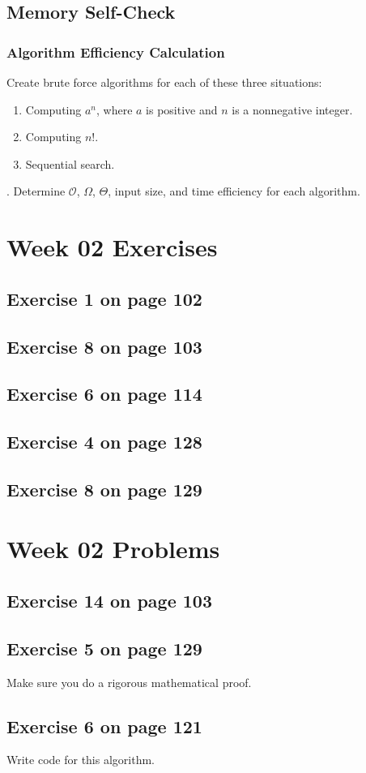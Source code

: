 \documentclass[12pt]{amsart}
\begin{document}
\subsection{Memory Self-Check}

\subsubsection{Algorithm Efficiency Calculation}

Create brute force algorithms for each of these three situations:
\begin{enumerate}
     \item Computing $a^n$, where $a$ is positive and $n$ is a nonnegative integer.
     \item Computing $n!$.
     \item Sequential search.
\end{enumerate}.
Determine $\mathcal{O}$, $\Omega$, $\Theta$, input size, and time efficiency for each algorithm. 



\section{Week 02 Exercises}
\subsection{ Exercise 1 on page 102} 
\subsection{Exercise 8 on page 103} 
\subsection{Exercise 6 on page 114} 
\subsection{Exercise 4 on page 128} 
\subsection{Exercise 8 on page 129}


\section{Week 02 Problems}
\subsection{Exercise 14 on page 103} 
\subsection{Exercise 5 on page 129} Make sure you do a rigorous mathematical proof.
\subsection{Exercise 6 on page 121} Write code for this algorithm.
\end{document}

